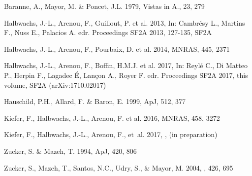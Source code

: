 \documentclass{sf2a-conf2017}
\begin{document}
\begin{thebibliography}{}

Baranne, A., Mayor, M. \& Poncet, J.L. 1979, Vistas in A., 23, 279

Halbwachs, J.-L., Arenou, F., Guillout, P. et al. 2013, In: Cambr\'esy L.,
Martins  F., Nuss E., Palacios A. edr. Proceedings SF2A 2013, 127-135, SF2A

Halbwachs, J.-L., Arenou, F., Pourbaix, D. et al. 2014, MNRAS, 445, 2371

Halbwachs, J.-L., Arenou, F., Boffin, H.M.J. et al. 2017, In: 
Reyl\'e C., Di Matteo P., Herpin F., Lagadec \'E, Lan\c con A., Royer F. edr.
Proceedings SF2A 2017, this volume, SF2A (arXiv:1710.02017)

Hauschild, P.H., Allard, F. \& Baron, E. 1999, ApJ, 512, 377

Kiefer, F., Halbwachs, J.-L., Arenou, F. et al. 2016, MNRAS, 458, 3272

{Kiefer}, F., {Halbwachs}, J.-L., {Arenou}, F., {et~al.} 2017, \mnras, (in preparation)

Zucker, S. \& Mazeh, T. 1994, ApJ, 420, 806

{Zucker}, S., {Mazeh}, T., {Santos}, N.C., {Udry}, S., \&
{Mayor}, M. 2004, \aap, 426, 695

\end{thebibliography}



%
\end{document}
